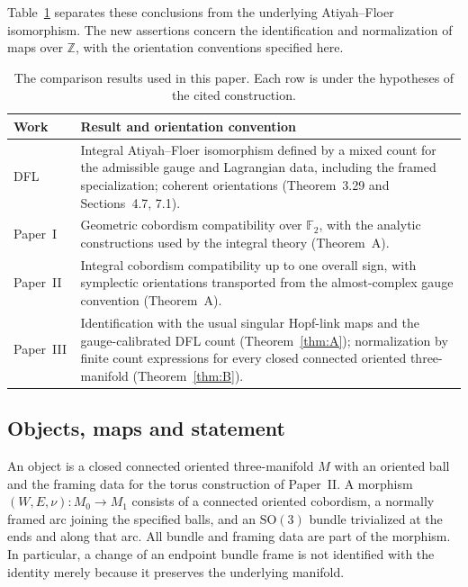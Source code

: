 \documentclass[11pt]{amsart}
\theoremstyle{definition}
\theoremstyle{remark}
\theoremstyle{plain}
\newcommand{\ZZ}{\mathbb Z}
\newcommand{\SO}{\mathrm{SO}}
\begin{document}
Table~\ref{tab:comparison} separates these conclusions from the
underlying Atiyah--Floer isomorphism. The new assertions concern
the identification and normalization of maps over $\ZZ$, with the
orientation conventions specified here.
\begin{table}[ht]
\caption{The comparison results used in this paper. Each row is
under the hypotheses of the cited construction.}
\label{tab:comparison}
\small
\renewcommand{\arraystretch}{1.15}
\begin{tabular}{@{}p{}p{}@{}}
\hline
Work & Result and orientation convention \\
\hline
DFL~\cite{DFL} & Integral Atiyah--Floer isomorphism defined by a
mixed count for the admissible gauge and Lagrangian data, including
the framed specialization; coherent orientations
(Theorem~3.29 and Sections~4.7, 7.1). \\
Paper~I~\cite{PaperI} & Geometric cobordism compatibility over
$\mathbb F_2$, with the analytic constructions used by the
integral theory (Theorem~A). \\
Paper~II~\cite{PaperII} & Integral cobordism compatibility up to
one overall sign, with symplectic orientations transported from
the almost-complex gauge convention (Theorem~A). \\
Paper~III & Identification with the usual singular Hopf-link
maps and the gauge-calibrated DFL count (Theorem~\ref{thm:A});
normalization by finite count expressions for every closed
connected oriented three-manifold (Theorem~\ref{thm:B}). \\
\hline
\end{tabular}
\end{table}

\subsection{Objects, maps and statement}
An object is a closed connected oriented three-manifold $M$ with an
oriented ball and the framing data for the torus construction of
Paper~II. A morphism $(W,E,\nu):M_0\to M_1$ consists of a connected
oriented cobordism, a normally framed arc joining the specified balls,
and an $\SO(3)$ bundle trivialized at the ends and along that arc.
All bundle and framing data are part of the morphism. In particular,
a change of an endpoint bundle frame is not identified with the
identity merely because it preserves the underlying manifold.
\end{document}
